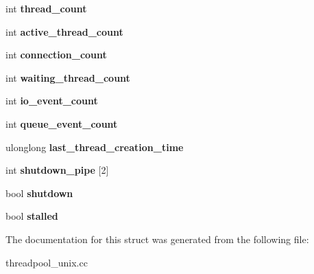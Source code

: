 \begin{DoxyCompactItemize}
int {\bfseries thread\+\_\+count}
\item 
\mbox{\label{structthread__group__t_a2877cbf99093c97ada7765bfde691e5f}} 
int {\bfseries active\+\_\+thread\+\_\+count}
\item 
\mbox{\label{structthread__group__t_aa8dfb6477f89c2b6d1b9e84842d8aa36}} 
int {\bfseries connection\+\_\+count}
\item 
\mbox{\label{structthread__group__t_a9db3c526dcee97c4755691949b07059a}} 
int {\bfseries waiting\+\_\+thread\+\_\+count}
\item 
\mbox{\label{structthread__group__t_a45231b70948ffbe628d5e1c46544d29a}} 
int {\bfseries io\+\_\+event\+\_\+count}
\item 
\mbox{\label{structthread__group__t_ae0b4a2b39cd8394a17bcde6d0bace6ed}} 
int {\bfseries queue\+\_\+event\+\_\+count}
\item 
\mbox{\label{structthread__group__t_a6352850a9b51b20c23a98df9b595909f}} 
ulonglong {\bfseries last\+\_\+thread\+\_\+creation\+\_\+time}
\item 
\mbox{\label{structthread__group__t_a7cc46630de3617f649ba78e46bdeb7ea}} 
int {\bfseries shutdown\+\_\+pipe} \mbox{[}2\mbox{]}
\item 
\mbox{\label{structthread__group__t_aec91d0a6a74734124d1df0ec653e05a6}} 
bool {\bfseries shutdown}
\item 
\mbox{\label{structthread__group__t_ada600bb6da639ae365c0c2c0e4236694}} 
bool {\bfseries stalled}
\end{DoxyCompactItemize}


The documentation for this struct was generated from the following file\+:\begin{DoxyCompactItemize}
\item 
threadpool\+\_\+unix.\+cc\end{DoxyCompactItemize}
